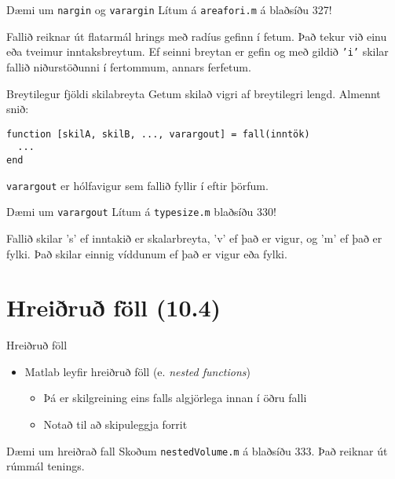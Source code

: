 \documentclass{beamer}
\begin{document}
\begin{frame}{Dæmi um \texttt{nargin} og \texttt{varargin}}
Lítum á \texttt{areafori.m} á blaðsíðu 327!

Fallið reiknar út flatarmál hrings með radíus gefinn í fetum. Það tekur við einu eða tveimur inntaksbreytum. Ef seinni breytan er gefin og með gildið \texttt{'i'} skilar fallið niðurstöðunni í fertommum, annars ferfetum.
\end{frame}

\begin{frame}[fragile]{Breytilegur fjöldi skilabreyta}
Getum skilað vigri af breytilegri lengd. Almennt snið:
\begin{verbatim}
function [skilA, skilB, ..., varargout] = fall(inntök)
  ...
end
\end{verbatim}
\texttt{varargout} er hólfavigur sem fallið fyllir í eftir þörfum.
\end{frame}

\begin{frame}{Dæmi um \texttt{varargout}}
Lítum á \texttt{typesize.m} blaðsíðu 330!

Fallið skilar 's' ef inntakið er skalarbreyta, 'v' ef það er vigur, og 'm' ef það er fylki. Það skilar einnig víddunum ef það er vigur eða fylki.
\end{frame}

\section{Hreiðruð föll (10.4)}

\begin{frame}{Hreiðruð föll}
\begin{itemize}
 \item Matlab leyfir hreiðruð föll (e. \emph{nested functions})
 \begin{itemize}
  \item Þá er skilgreining eins falls algjörlega innan í öðru falli
  \item Notað til að skipuleggja forrit
 \end{itemize}
\end{itemize}
\end{frame}

\begin{frame}[fragile]{Dæmi um hreiðrað fall}
Skoðum \texttt{nestedVolume.m} á blaðsíðu 333. Það reiknar út rúmmál tenings.
\end{frame}
\end{document}
